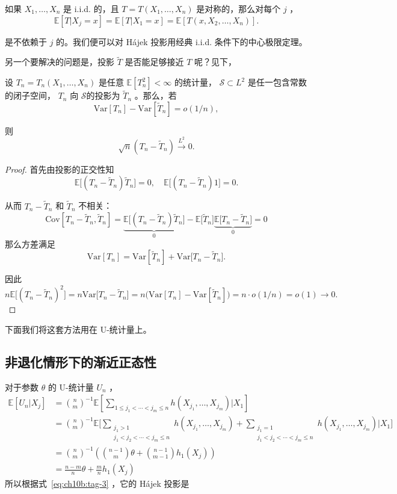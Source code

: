 如果 $X_1,\dots,X_n$ 是 i.i.d. 的，且 $T=T(X_1,\dots,X_n)$ 是对称的，那么对每个 $j$ ，
\[
\mathbb E[T|X_j=x]=\mathbb E[T|X_1=x]=\mathbb E[T(x,X_2,\dots,X_n)].
\]

是不依赖于 $j$ 的。我们便可以对 Hájek 投影用经典 i.i.d. 条件下的中心极限定理。

另一个要解决的问题是，投影 $\widetilde T$ 是否能足够接近 $T$ 呢？见下，

\begin{lemma}[投影逼近]\label{lem:ch10:hajek-approximation}

设 $T_n=T_n(X_1,\dots,X_n)$ 是任意 $\mathbb E[T_n^2]<\infty$ 的统计量， $\mathscr S\subset L^2$ 是任一包含常数的闭子空间， $T_n$ 向 $\mathscr S$的投影为 $\widetilde T\!_n$ 。那么，若
\[
\mathrm{Var}[T_n]-\mathrm{Var}[\widetilde T\!_n]=o(1/n),
\]

则
\[
\sqrt n(T_n-\widetilde T_n)\overset{L^2}\longrightarrow 0.
\]

\end{lemma}

\begin{proof}

首先由投影的正交性知
\[
\mathbb{E}\big[(T_n - \widetilde{T}\!_n)\widetilde{T}\!_n\big] = 0,\quad \mathbb{E}\big[(T_n - \widetilde{T}\!_n)1\big] = 0.
\]

从而 $T_n-\widetilde T\!_n$ 和 $\widetilde T\!_n$ 不相关：
\[\mathrm{Cov}[T_n-\widetilde T\!_n,\widetilde T\!_n]=\underbrace{\mathbb E\big[(T_n-\widetilde T\!_n)\widetilde T\!_n\big]}_{0}-\mathbb E\big[\widetilde T\!_n\big]\underbrace{\mathbb E\big[T_n-\widetilde T\!_n\big]}_{0}=0\]
那么方差满足
\[
\mathrm{Var}[T_n]=\mathrm{Var}[\widetilde T\!_n]+\mathrm{Var}\big[T_n-\widetilde T\!_n\big].
\]

因此
\[
n\mathbb E\big[(T_n-\widetilde T\!_n)^2\big]=n\mathrm{Var}\big[T_n-\widetilde T\!_n\big]=n\big(\mathrm{Var}[T_n]-\mathrm{Var}[\widetilde T_n]\big)=n\cdot o(1/n)=o(1)\longrightarrow 0.
\]

\end{proof}

下面我们将这套方法用在 U-统计量上。

\subsection{非退化情形下的渐近正态性}

对于参数 $\theta$ 的 U-统计量 $U_n$ ，
\[\begin{aligned} \mathbb E[U_n|X_j]&=\binom nm^{-1}\mathbb E\left[\sum_{1\le j_1<\cdots<j_m\le n}h(X_{j_1},\dots,X_{j_m})\Bigg|X_1\right]\\ &=\binom nm^{-1}\mathbb E\Bigg[\sum_{\substack{j_1>1\\j_1< j_2<\cdots<j_m\le n}}h(X_{j_1},\dots,X_{j_m})+\sum_{\substack{j_1=1\\j_1< j_2<\cdots<j_m\le n}}h(X_{j_1},\dots,X_{j_m})\Bigg|X_1\Bigg]\\ &= {\binom{n}{m}}^{-1}\left( \binom{n-1}{m}\theta + \binom{n-1}{m-1} h_1(X_j) \right)\\ &=\frac{n-m}{n}\theta + \frac{m}{n} h_1(X_j) \end{aligned}\]
所以根据式~\eqref{eq:ch10b:tag-3} ，它的 Hájek 投影是

